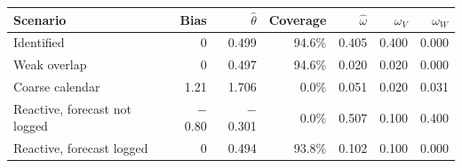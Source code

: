 \begin{tabular}{lrrrrrr}
\toprule
Scenario & Bias & $\hat\theta$ & Coverage & $\hat\omega$ & $\omega_V$ & $\omega_W$ \\
\midrule
Identified & 0 & 0.499 & 94.6\% & 0.405 & 0.400 & 0.000 \\
Weak overlap & 0 & 0.497 & 94.6\% & 0.020 & 0.020 & 0.000 \\
Coarse calendar & 1.21 & 1.706 & 0.0\% & 0.051 & 0.020 & 0.031 \\
Reactive, forecast not logged & $-$0.80 & $-$0.301 & 0.0\% & 0.507 & 0.100 & 0.400 \\
Reactive, forecast logged & 0 & 0.494 & 93.8\% & 0.102 & 0.100 & 0.000 \\
\bottomrule
\end{tabular}
